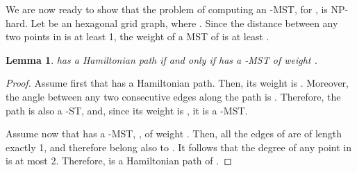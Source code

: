 \documentclass[11pt]{article}
\newtheorem{lemma}[theorem]{Lemma}
\begin{document}
{We are now ready to show that the problem of computing an -MST, for , is NP-hard.
Let  be an hexagonal grid graph, where . Since the distance between any two points in  is at least 1, the weight of a MST of  is at least .
\begin{lemma}
 has a Hamiltonian path if and only if  has a -MST of weight . 
\end{lemma}
\begin{proof}
Assume first that  has a Hamiltonian path. Then, its weight is . Moreover, the angle between any two consecutive edges along the path is . Therefore, the path is also a -ST, and, since its weight is , it is a -MST.

Assume now that  has a -MST, , of weight .
Then, all the edges of  are of length exactly 1, and therefore belong also to . It follows that the degree of any point in  is at most 2. Therefore,  is a Hamiltonian path of . 
\end{proof}
}
\end{document}
